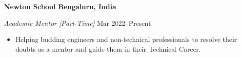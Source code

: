 \textbf{Newton School \hfill  Bengaluru, India} \par
\textit{Academic Mentor \small [Part-Time]} \hfill Mar 2022--Present
\begin{itemize}
	\item Helping budding engineers and non-technical professionals to resolve their doubts as a mentor and guide them in their Technical Career.
\end{itemize} \par